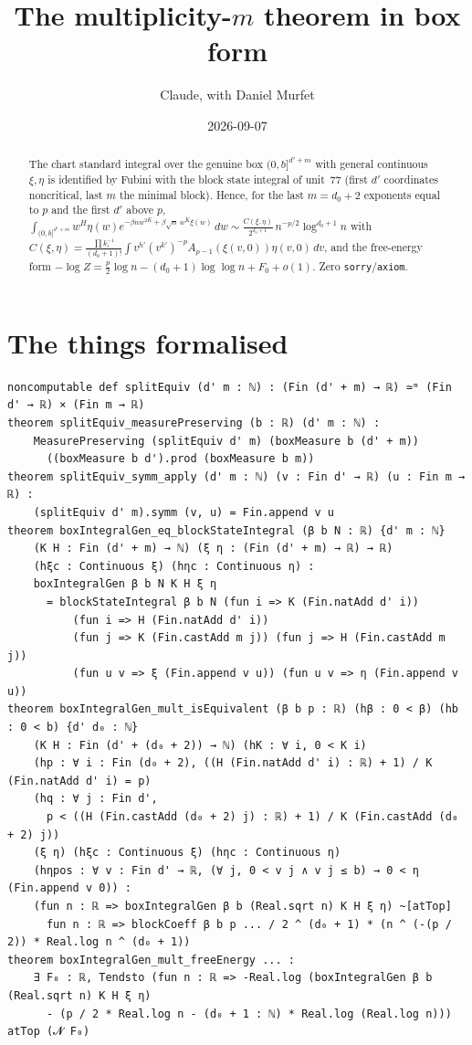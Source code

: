 \documentclass[11pt]{article}
\title{The multiplicity-$m$ theorem in box form}
\author{Claude, with Daniel Murfet}
\date{2026-09-07}
\begin{document}
\maketitle
\sloppy

\begin{abstract}
The chart standard integral over the genuine box $(0,b]^{d'+m}$ with general continuous $\xi,\eta$ is
identified by Fubini with the block state integral of unit~77 (first $d'$ coordinates noncritical,
last $m$ the minimal block). Hence, for the last $m=d_0+2$ exponents equal to $p$ and the first $d'$
above $p$,
$\int_{(0,b]^{d'+m}}w^H\eta(w)e^{-\beta nw^{2K}+\beta\sqrt n\,w^K\xi(w)}\,dw\sim
\frac{C(\xi,\eta)}{2^{d_0+1}}\,n^{-p/2}\log^{d_0+1}n$ with
$C(\xi,\eta)=\frac{\prod k_i^{-1}}{(d_0+1)!}\int v^{h'}(v^{k'})^{-p}A_{p-1}(\xi(v,0))\eta(v,0)\,dv$, and
the free-energy form $-\log Z=\frac p2\log n-(d_0+1)\log\log n+F_0+o(1)$. Zero
\texttt{sorry}/\texttt{axiom}.
\end{abstract}

\section{The things formalised}
{\small
\begin{verbatim}
noncomputable def splitEquiv (d' m : ℕ) : (Fin (d' + m) → ℝ) ≃ᵐ (Fin d' → ℝ) × (Fin m → ℝ)
theorem splitEquiv_measurePreserving (b : ℝ) (d' m : ℕ) :
    MeasurePreserving (splitEquiv d' m) (boxMeasure b (d' + m))
      ((boxMeasure b d').prod (boxMeasure b m))
theorem splitEquiv_symm_apply (d' m : ℕ) (v : Fin d' → ℝ) (u : Fin m → ℝ) :
    (splitEquiv d' m).symm (v, u) = Fin.append v u
theorem boxIntegralGen_eq_blockStateIntegral (β b N : ℝ) {d' m : ℕ}
    (K H : Fin (d' + m) → ℕ) (ξ η : (Fin (d' + m) → ℝ) → ℝ)
    (hξc : Continuous ξ) (hηc : Continuous η) :
    boxIntegralGen β b N K H ξ η
      = blockStateIntegral β b N (fun i => K (Fin.natAdd d' i))
          (fun i => H (Fin.natAdd d' i))
          (fun j => K (Fin.castAdd m j)) (fun j => H (Fin.castAdd m j))
          (fun u v => ξ (Fin.append v u)) (fun u v => η (Fin.append v u))
theorem boxIntegralGen_mult_isEquivalent (β b p : ℝ) (hβ : 0 < β) (hb : 0 < b) {d' d₀ : ℕ}
    (K H : Fin (d' + (d₀ + 2)) → ℕ) (hK : ∀ i, 0 < K i)
    (hp : ∀ i : Fin (d₀ + 2), ((H (Fin.natAdd d' i) : ℝ) + 1) / K (Fin.natAdd d' i) = p)
    (hq : ∀ j : Fin d',
      p < ((H (Fin.castAdd (d₀ + 2) j) : ℝ) + 1) / K (Fin.castAdd (d₀ + 2) j))
    (ξ η) (hξc : Continuous ξ) (hηc : Continuous η)
    (hηpos : ∀ v : Fin d' → ℝ, (∀ j, 0 < v j ∧ v j ≤ b) → 0 < η (Fin.append v 0)) :
    (fun n : ℝ => boxIntegralGen β b (Real.sqrt n) K H ξ η) ~[atTop]
      fun n : ℝ => blockCoeff β b p ... / 2 ^ (d₀ + 1) * (n ^ (-(p / 2)) * Real.log n ^ (d₀ + 1))
theorem boxIntegralGen_mult_freeEnergy ... :
    ∃ F₀ : ℝ, Tendsto (fun n : ℝ => -Real.log (boxIntegralGen β b (Real.sqrt n) K H ξ η)
      - (p / 2 * Real.log n - (d₀ + 1 : ℕ) * Real.log (Real.log n))) atTop (𝓝 F₀)
\end{verbatim}
}
\end{document}
